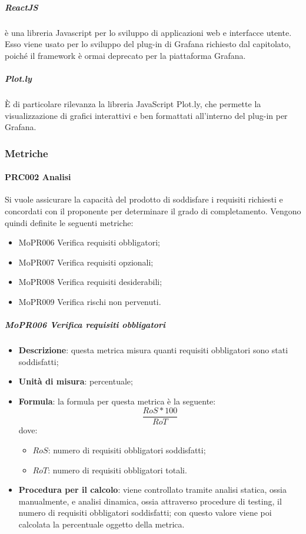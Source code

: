 \documentclass[../norme-di-progetto.tex]{subfiles}
\begin{document}
\subparagraph{ReactJS}
 è una libreria Javascript per lo sviluppo di applicazioni web e interfacce utente. Esso viene usato per lo sviluppo del plug-in di Grafana richiesto dal capitolato, poiché il framework  è ormai deprecato per la piattaforma Grafana.

\subparagraph{Plot.ly}
È di particolare rilevanza la libreria JavaScript Plot.ly, che permette la visualizzazione di grafici interattivi e ben formattati all'interno del plug-in per Grafana.

\subsubsection{Metriche}
\paragraph{PRC002 Analisi}
Si vuole assicurare la capacità del prodotto di soddisfare i requisiti richiesti e concordati con il proponente per determinare il grado di completamento. Vengono quindi definite le seguenti metriche:
\begin{itemize}
  \item MoPR006 Verifica requisiti obbligatori;
  \item MoPR007 Verifica requisiti opzionali;
  \item MoPR008 Verifica requisiti desiderabili;
  \item MoPR009 Verifica rischi non pervenuti.
\end{itemize}
\subparagraph{MoPR006 Verifica requisiti obbligatori}
\begin{itemize}
  \item \textbf{Descrizione}: questa metrica misura quanti requisiti obbligatori sono stati soddisfatti;
  \item \textbf{Unità di misura}: percentuale;
  \item \textbf{Formula}: la formula per questa metrica è la seguente:
  \begin{displaymath}
    \frac{RoS * 100}{RoT}
  \end{displaymath}
  dove:
  \begin{itemize}
    \item $ RoS $: numero di requisiti obbligatori soddisfatti;
    \item $ RoT $: numero di requisiti obbligatori totali.
  \end{itemize}
  \item \textbf{Procedura per il calcolo}: viene controllato tramite analisi statica, ossia manualmente, e analisi dinamica, ossia attraverso procedure di testing, il numero di requisiti obbligatori soddisfatti; con questo valore viene poi calcolata la percentuale oggetto della metrica.
\end{itemize}
\end{document}
